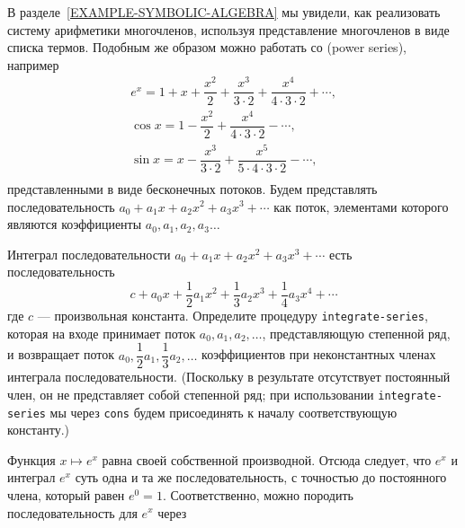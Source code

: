 \begin{exercise}{3.59}\label{EX3.59}%
В разделе~\ref{EXAMPLE-SYMBOLIC-ALGEBRA} мы
увидели, как реализовать систему арифметики многочленов, используя
представление многочленов в виде списка термов.  Подобным же образом
можно работать со
  (power series),
например
%
%
%
$$
\begin{array}{l}
e^x = 1 + x + \dfrac{x^2}{2} + \dfrac{x^3}{3 \cdot 2} + \dfrac{x^4}{4 \cdot 3 \cdot 2} + \cdots,\\[10 pt]
\cos x = 1 - \dfrac{x^2}{2} + \dfrac{x^4}{4 \cdot 3 \cdot 2} - \cdots,\\ [10pt]
\sin x = x - \dfrac{x^3}{3 \cdot 2} + \dfrac{x^5}{5 \cdot 4 \cdot 3 \cdot 2} - \cdots,\\
\end{array}
$$
представленными в виде бесконечных потоков.  Будем представлять
последовательность $a_0 + a_1 x + a_2 x^2 + a_3 x^3 + \cdots$
как поток, элементами которого являются коэффициенты
$a_0, a_1, a_2, a_3 \ldots$

\begin{plainenum}

\item
{}   Интеграл последовательности
$a_0 + a_1 x + a_2 x^2 + a_3 x^3 + \cdots$ есть
последовательность
$$
c + a_0 x + \frac{1}{2} a_1 x^2 + \frac{1}{3} a_2 x^3 + \frac{1}{4} a_3 x^4 + \cdots
$$
где $c$ --- произвольная константа.  Определите процедуру
{\tt integrate-series},
которая на входе принимает поток
$a_0, a_1, a_2,\ldots$, представляющую степенной ряд, и
возвращает поток
$a_0, \dfrac{1}{2} a_1, \dfrac{1}{3} a_2, \ldots$
коэффициентов при неконстантных членах интеграла последовательности.
(Поскольку в результате отсутствует постоянный член, он не
представляет собой степенной ряд; при использовании
{\tt integrate-series} мы через {\tt cons} будем
присоединять к началу соответствующую константу.)

\item
Функция $x \mapsto e^x$ равна своей
собственной производной.  Отсюда следует, что $e^x$ и
интеграл $e^x$ суть одна и та же последовательность, с
точностью до постоянного члена, который равен $e^0 = 1$.
Соответственно, можно породить последовательность для $e^x$
через


\end{plainenum}
\end{exercise}
